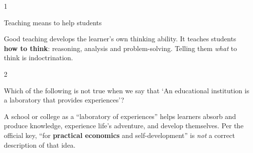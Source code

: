 \begin{question}{1}
{Teaching means to help students\par}
\begin{explain}
Good teaching develops the learner's own thinking ability. It teaches students \textbf{how to think}: reasoning, analysis and problem-solving. Telling them \emph{what} to think is indoctrination.
\end{explain}
\end{question}

\begin{question}{2}
{Which of the following is not true when we say that `An educational institution is a laboratory that provides experiences'?\par}
\begin{explain}
A school or college as a ``laboratory of experiences'' helps learners absorb and produce knowledge, experience life's adventure, and develop themselves. Per the official key, ``for \textbf{practical economics} and self-development'' is \emph{not} a correct description of that idea.
\end{explain}
\end{question}

